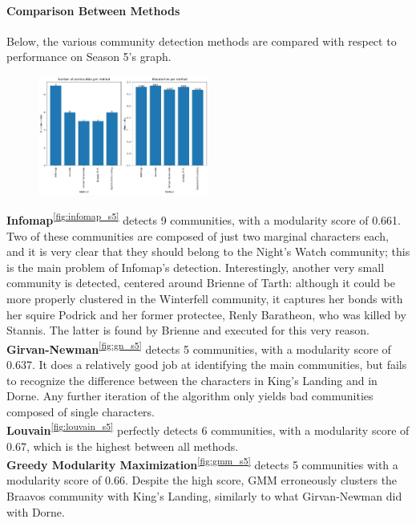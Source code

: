\documentclass[10pt,twocolumn,letterpaper]{article}
\begin{document}
\paragraph{Comparison Between Methods}

Below, the various community detection methods are compared with respect to performance on Season 5's graph.


\begin{figure}[!h]
    \centering
    \includegraphics[width=0.5\textwidth]{img/s5/communities_comparison.jpg}
\end{figure}

\textbf{Infomap}\textsuperscript{\ref{fig:infomap_s5}} detects 9 communities, with a modularity score of 0.661. Two of these communities are composed of just two marginal characters each, and it is very clear that they should belong to the Night's Watch community; this is the main problem of Infomap's detection. Interestingly, another very small community is detected, centered around Brienne of Tarth: although it could be more properly clustered in the Winterfell community, it captures her bonds with her squire Podrick and her former protectee, Renly Baratheon, who was killed by Stannis. The latter is found by Brienne and executed for this very reason. \\

\textbf{Girvan-Newman}\textsuperscript{\ref{fig:gn_s5}} detects 5 communities, with a modularity score of 0.637. It does a relatively good job at identifying the main communities, but fails to recognize the difference between the characters in King's Landing and in Dorne. Any further iteration of the algorithm only yields bad communities composed of single characters.\\

\textbf{Louvain}\textsuperscript{\ref{fig:louvain_s5}} perfectly detects 6 communities, with a modularity score of 0.67, which is the highest between all methods. \\

\textbf{Greedy Modularity Maximization}\textsuperscript{\ref{fig:gmm_s5}} detects 5 communities with a modularity score of 0.66. Despite the high score, GMM erroneously clusters the Braavos community with King's Landing, similarly to what Girvan-Newman did with Dorne. \\
\end{document}

